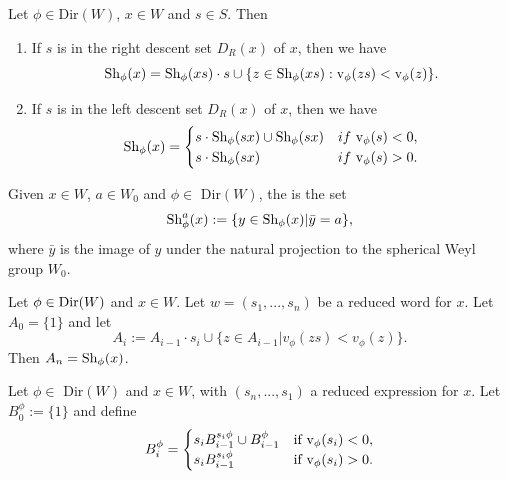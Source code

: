 \documentclass[11pt]{article}
\begin{document}
\begin{theorem}
    Let $\phi\in$Dir$(W)$, $x\in W$ and $s\in S$. Then
    \begin{enumerate}
        \item If $s$ is in the right descent set $D_R(x)$ of $x$, then we have
        \[\textnormal{Sh}_\phi(x)=\textnormal{Sh}_\phi(xs)\cdot s \cup \{z\in \textnormal{Sh}_\phi(xs):\textnormal{v}_\phi(zs)<\textnormal{v}_\phi(z)\}.\]
        \item If $s$ is in the left descent set $D_R(x)$ of $x$, then we have
        \[\textnormal{Sh}_\phi(x)=\begin{cases}
            s\cdot \textnormal{Sh}_\phi(sx)\cup \textnormal{Sh}_\phi(sx) &if\textnormal{ v}_\phi(s)<0,\\
            s\cdot \textnormal{Sh}_\phi(sx) &if \textnormal{ v}_\phi(s)>0.\\
        \end{cases}\]
    \end{enumerate}
\end{theorem}


\begin{definition}
    Given $x\in W$, $a\in W_0$ and $\phi\in$ Dir$(W)$, the  is the set 
    \[\textnormal{Sh}_\phi^a(x):=\{y\in \textnormal{Sh}_\phi(x)|\bar{y}=a\},\]
    where $\bar{y}$ is the image of $y$ under the natural projection to the spherical Weyl group $W_0$. 
\end{definition}


\begin{lemma}
    Let $\phi\in\textnormal{Dir}(W)$ and $x\in W$. Let $w=(s_1,...,s_n)$ be a reduced word for $x$. Let $A_0=\{1\}$ and let
    \[A_i:=A_{i-1}\cdot s_i\cup \{z\in A_{i-1}|v_\phi(zs)<v_\phi(z)\}.\]
    Then $A_n=\textnormal{Sh}_\phi(x)$. 
\end{lemma}

\begin{lemma}
    Let $\phi\in$ Dir$(W)$ and $x\in W$, with $(s_n,...,s_1)$ a reduced expression for $x$. Let $B_0^\phi:=\{1\}$ and define
    \[B_i^\phi = \begin{cases}
        s_iB_{i-1}^{s_i\phi}\cup B_{i-1}^\phi & \textnormal{if v}_\phi(s_i)<0,\\
        s_iB_{i-1}^{s_i\phi} & \textnormal{if v}_\phi(s_i)>0.
    \end{cases}\]
\end{lemma}
\end{document}
